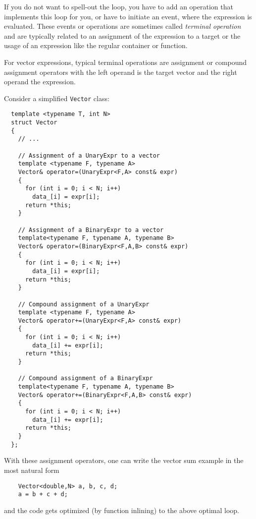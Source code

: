 If you do not want to spell-out the loop, you have to add an operation that implements this loop for
you, or have to initiate an event, where the expression is evaluated. These events or operations are
sometimes called \emph{terminal operation} and are typically related to an assignment of the expression
to a target or the usage of an expression like the regular container or function.

For vector expressions, typical terminal operations are assignment or compound assignment operators
with the left operand is the target vector and the right operand the expression.

Consider a simplified \texttt{Vector} class:
%
\begin{verbatim}
  template <typename T, int N>
  struct Vector
  {
    // ...

    // Assignment of a UnaryExpr to a vector
    template <typename F, typename A>
    Vector& operator=(UnaryExpr<F,A> const& expr)
    {
      for (int i = 0; i < N; i++)
        data_[i] = expr[i];
      return *this;
    }

    // Assignment of a BinaryExpr to a vector
    template<typename F, typename A, typename B>
    Vector& operator=(BinaryExpr<F,A,B> const& expr)
    {
      for (int i = 0; i < N; i++)
        data_[i] = expr[i];
      return *this;
    }

    // Compound assignment of a UnaryExpr
    template <typename F, typename A>
    Vector& operator+=(UnaryExpr<F,A> const& expr)
    {
      for (int i = 0; i < N; i++)
        data_[i] += expr[i];
      return *this;
    }

    // Compound assignment of a BinaryExpr
    template<typename F, typename A, typename B>
    Vector& operator+=(BinaryExpr<F,A,B> const& expr)
    {
      for (int i = 0; i < N; i++)
        data_[i] += expr[i];
      return *this;
    }
  };
\end{verbatim}

\begin{example}
  With these assignment operators, one can write the vector sum example in the most natural form
  \begin{verbatim}
    Vector<double,N> a, b, c, d;
    a = b + c + d;
  \end{verbatim}
  and the code gets optimized (by function inlining) to the above optimal loop.
\end{example}

